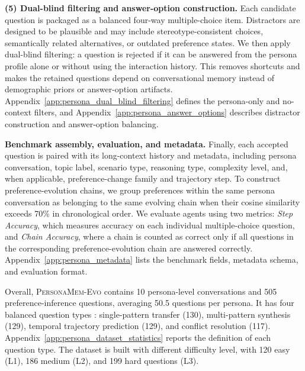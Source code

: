 \documentclass{llmxive}
\begin{document}
\textbf{(5) Dual-blind filtering and answer-option construction.}
Each candidate question is packaged as a balanced four-way multiple-choice item. Distractors are designed to be plausible and may include stereotype-consistent choices, semantically related alternatives, or outdated preference states. We then apply dual-blind filtering: a question is rejected if it can be answered from the persona profile alone or without using the interaction history. This removes shortcuts and makes the retained questions depend on conversational memory instead of demographic priors or answer-option artifacts. Appendix~\ref{app:persona_dual_blind_filtering} defines the persona-only and no-context filters, and Appendix~\ref{app:persona_answer_options} describes distractor construction and answer-option balancing.

\textbf{Benchmark assembly, evaluation, and metadata.} \noindent
Finally, each accepted question is paired with its long-context history and metadata, including persona conversation, topic label, scenario type, reasoning type, complexity level, and, when applicable, preference-change family and trajectory step. To construct preference-evolution chains, we group preferences within the same persona conversation as belonging to the same evolving chain when their cosine similarity exceeds 70\% in chronological order. 
We evaluate agents using two metrics: \emph{Step Accuracy}, which measures accuracy on each individual multiple-choice question, and \emph{Chain Accuracy}, where a chain is counted as correct only if all questions in the corresponding preference-evolution chain are answered correctly. 
Appendix~\ref{app:persona_metadata} lists the benchmark fields, metadata schema, and evaluation format.


Overall, \textsc{PersonaMem-Evo} contains 10 persona-level conversations and 505 preference-inference questions, averaging 50.5 questions per persona. It has four balanced question types : single-pattern transfer (130), multi-pattern synthesis (129), temporal trajectory prediction (129), and conflict resolution (117).
Appendix~\ref{app:persona_dataset_statistics} reports the definition of each question type.
The dataset is built with different difficulty level, with 120 easy (L1), 186 medium (L2), and 199 hard questions (L3). 
\end{document}
